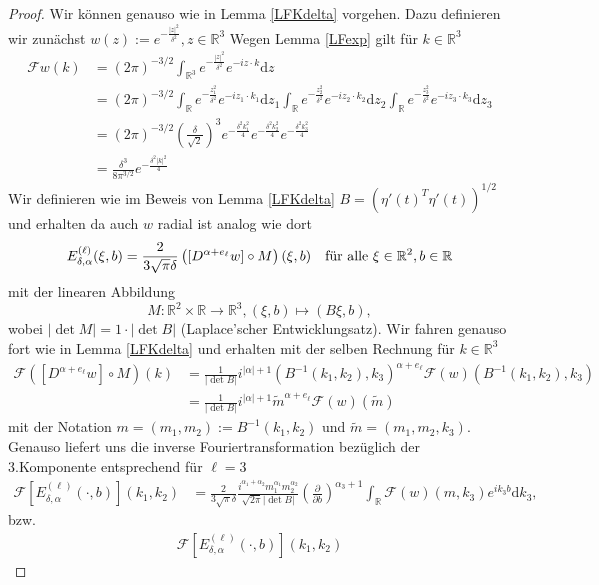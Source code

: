 \documentclass[12pt,a4paper]{scrartcl}
\newcommand{\dd}{\mathrm{d}}
\numberwithin{equation}{section}
\newcommand{\R}{\mathbb{R}} %
\newcommand{\F}{\mathcal{F}} %
\newcommand{\fa}{\text{\quad für alle }}
\begin{document}
\begin{proof}
Wir können genauso wie in Lemma \ref{LFKdelta} vorgehen. Dazu definieren wir zunächst $w(z):= e^{-\frac{|z|^2}{\delta^2}}, z \in \R^3$
Wegen Lemma \ref{LFexp} gilt für $k \in \R^3$
\begin{align*}
\F w (k) 
&=(2\pi)^{-3/2} \int_{\R^3} e^{-\frac{|z|^2}{\delta^2}} e^{-i z \cdot k} \dd z \\
&=(2\pi)^{-3/2}
\int_{\R} e^{-\frac{z_1^2}{\delta^2}} e^{-i z_1 \cdot k_1} \dd z_1 
\int_{\R} e^{-\frac{z_2^2}{\delta^2}} e^{-i z_2 \cdot k_2} \dd z_2 
\int_{\R} e^{-\frac{z_3^2}{\delta^2}} e^{-i z_3 \cdot k_3} \dd z_3 \\
&= (2 \pi)^{-3/2} \left( \frac{\delta}{\sqrt{2}}\right)^3 
e^{-\frac{\delta^2 k_1^2}{4}}
e^{-\frac{\delta^2 k_2^2}{4}}
e^{-\frac{\delta^2 k_3^2}{4}} \\
&= \frac{\delta^3}{8 \pi^{3/2}} e^{-\frac{\delta^2 |k|^2}{4}}
\end{align*}
Wir definieren wie im Beweis von Lemma \ref{LFKdelta}  $B=(\eta'(t)^T \eta'(t))^{1/2}$ und erhalten da auch $w$ radial ist analog wie dort
\[
E_{\delta,\alpha}^{(\ell)}(\xi,b) = \frac{2}{3\sqrt{\pi}\delta} \left( [ D^{\alpha+ e_\ell} w] \circ M \right)(\xi,b) \fa \xi \in \R^2, b \in \R
\]
mit der linearen Abbildung
\[
M:\R^2 \times \R \to \R^3, (\xi, b) \mapsto (B\xi , b),
\]
wobei $|\det M| = 1 \cdot |\det B|$ (Laplace'scher Entwicklungsatz).
Wir fahren genauso fort wie in Lemma \ref{LFKdelta} und erhalten mit der selben Rechnung für $k \in \R^3$
\begin{align*}
\F \left( [ D^{\alpha+ e_\ell} w] \circ M \right)(k) 
&= \frac{1}{|\det B|}i^{|\alpha|+1}(B^{-1}(k_1,k_2),k_3)^{\alpha+e_\ell}\F(w)(B^{-1}(k_1,k_2),k_3) \\
&=\frac{1}{|\det B|}i^{|\alpha|+1}\widetilde m^{\alpha +e_\ell} \F (w) (\widetilde m) 
\end{align*}
mit der Notation $m=(m_1,m_2):= B^{-1}(k_1,k_2)$ und $\widetilde m= (m_1,m_2, k_3)$. Genauso liefert uns die inverse Fouriertransformation bezüglich der 3.Komponente entsprechend für $\ell=3$
\begin{align*}
\F [E_{\delta,\alpha}^{(\ell)}(\cdot,b) ](k_1,k_2) &= \frac{2}{3\sqrt{\pi}\delta} \frac{i^{\alpha_1 +\alpha_2} m_1^{\alpha_1}m_2^{\alpha_2}}{\sqrt{2\pi} |\det B|}\left(\frac{\partial}{\partial b}\right)^{\alpha_3+1} \int_{\R} \F(w)(m,k_3) e^{i k_3 b} \dd k_3,
\end{align*}
bzw. 
\begin{align*}
\F [E_{\delta,\alpha}^{(\ell)}(\cdot,b) ](k_1,k_2) 

\end{align*}
\end{proof}
\end{document}
